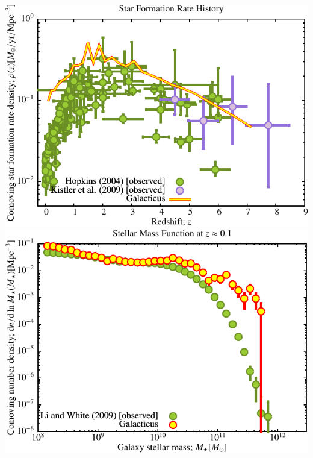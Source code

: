 \includegraphics[scale=0.6]{r256/NGenIC_26214/Plot_Star_Formation_History.pdf} 
\includegraphics[scale=0.6]{r256/NGenIC_26214/Plot_Stellar_Mass_Function.pdf} \\

